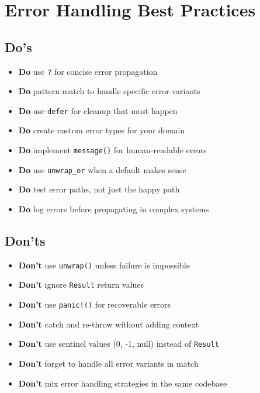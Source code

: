 \section{Error Handling Best Practices}
\label{sec:error-best-practices}

\subsection{Do's}

\begin{itemize}
    \item \textbf{Do} use \texttt{?} for concise error propagation
    \item \textbf{Do} pattern match to handle specific error variants
    \item \textbf{Do} use \texttt{defer} for cleanup that must happen
    \item \textbf{Do} create custom error types for your domain
    \item \textbf{Do} implement \texttt{message()} for human-readable errors
    \item \textbf{Do} use \texttt{unwrap\_or} when a default makes sense
    \item \textbf{Do} test error paths, not just the happy path
    \item \textbf{Do} log errors before propagating in complex systems
\end{itemize}

\subsection{Don'ts}

\begin{itemize}
    \item \textbf{Don't} use \texttt{unwrap()} unless failure is impossible
    \item \textbf{Don't} ignore \texttt{Result} return values
    \item \textbf{Don't} use \texttt{panic!()} for recoverable errors
    \item \textbf{Don't} catch and re-throw without adding context
    \item \textbf{Don't} use sentinel values (0, -1, null) instead of \texttt{Result}
    \item \textbf{Don't} forget to handle all error variants in match
    \item \textbf{Don't} mix error handling strategies in the same codebase
\end{itemize}

